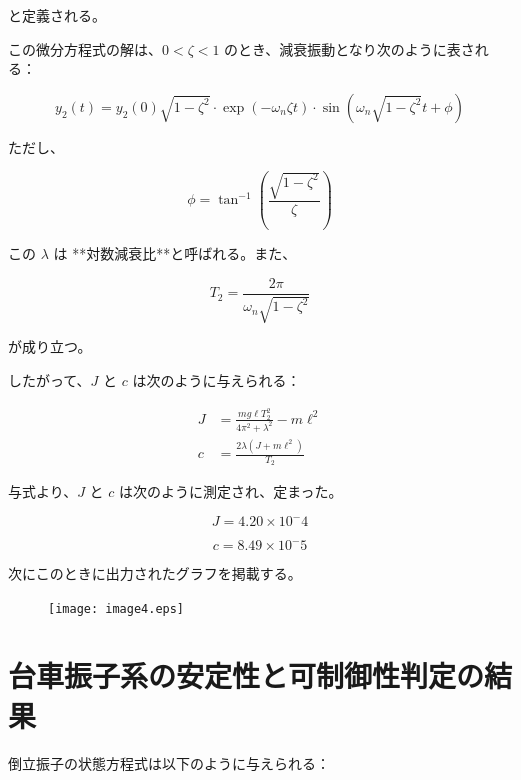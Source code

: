 \documentclass[10pt,a4paper,titlepage]{jreport} %
\begin{document}
と定義される。

この微分方程式の解は、$0 < \zeta < 1$ のとき、減衰振動となり次のように表される：

\begin{equation}
y_2(t) = y_2(0)\sqrt{1 - \zeta^2} \cdot \exp(-\omega_n \zeta t) \cdot \sin\left( \omega_n \sqrt{1 - \zeta^2} t + \phi \right)
\end{equation}

ただし、

\begin{equation}
\phi = \tan^{-1} \left( \frac{\sqrt{1 - \zeta^2}}{\zeta} \right)
\end{equation}

この $\lambda$ は **対数減衰比**と呼ばれる。また、

\begin{equation}
T_2 = \frac{2\pi}{\omega_n \sqrt{1 - \zeta^2}} \tag{13}
\end{equation}

が成り立つ。

したがって、$J$ と $c$ は次のように与えられる：

\begin{align}
J &= \frac{mg\ell T_2^2}{4\pi^2 + \lambda^2} - m\ell^2 \\
c &= \frac{2\lambda(J + m\ell^2)}{T_2} \tag{14}
\end{align}

与式より、$J$ と $c$ は次のように測定され、定まった。

\begin{equation}
J = 4.20 \times 10^-4
\end{equation}

\begin{equation}
c = 8.49 \times 10^-5
\end{equation}


次にこのときに出力されたグラフを掲載する。

\begin{figure}[H] %
  \centering
  \texttt{[image: image4.eps]} %
\end{figure}


\section{台車振子系の安定性と可制御性判定の結果}


倒立振子の状態方程式は以下のように与えられる：
\end{document}
